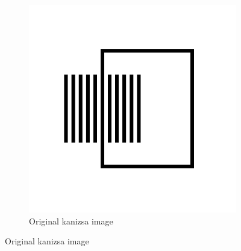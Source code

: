 \begin{figure}[H]
  \centering

\begin{subfigure}{.7\textwidth}
    \centering
    \includegraphics[width=.9\textwidth]{./canny/kanizsa}
    \caption{Original kanizsa image}
    \label{fig:kanizsa}
  \end{subfigure}%

\end{figure}
